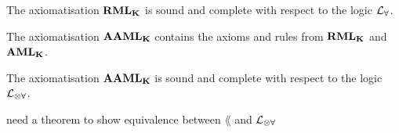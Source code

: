 \begin{lemma} \label{axiomRMLSoundComplete}
The axiomatisation $\bf RML_{\bf K}$ is sound and complete with respect to the logic $\mathcal{L}_{\forall}$.
\end{lemma}

\begin{defn} \label{axiomAAML}
The axiomatisation $\bf AAML_{\bf K}$ contains the axioms and rules from $\bf RML_{\bf K}$ and $\bf AML_{\bf K}$.
\end{defn}

\begin{thm} \label{axiomAAMLSoundComplete}
The axiomatisation $\bf AAML_{\bf K}$ is sound and complete with respect to the logic $\mathcal{L}_{\otimes\forall}$.
\end{thm}

\FIXME need a theorem to show equivalence between $\lang$ and $\mathcal{L}_{\otimes\forall}$
